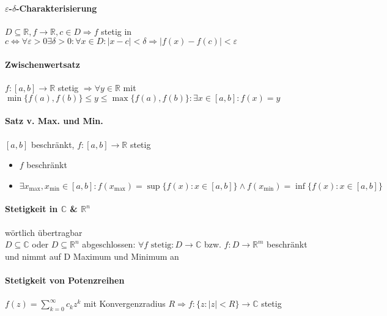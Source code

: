\documentclass[paper=a3,paper=landscape, fontsize=9pt,DIV=25]{scrartcl}
\newcommand{\real}{{\mathbb{R}}}
\newcommand{\compl}{\mathbb{C}}
\begin{document}
\begin{multicols*}{4}
  \paragraph{$\varepsilon$-$\delta$-Charakterisierung}
  $D \subseteq \real, f \rightarrow \real, c \in D \Rightarrow f$ stetig in $c \Leftrightarrow \forall \varepsilon > 0 \exists \delta > 0: \forall x \in D: \lvert x - c \rvert < \delta \Rightarrow \lvert f(x)-f(c)\rvert < \varepsilon$


  \paragraph{Zwischenwertsatz}
  $f:[a,b] \rightarrow \real$ stetig $\Rightarrow \forall y \in \real$ mit $ \min\{f(a),f(b)\} \leq y \leq \max\{f(a), f(b)\}: \exists x \in [a,b]: f(x)=y$


  \paragraph{Satz v. Max. und Min.}
  $[a,b]$ beschränkt, $f: [a,b] \rightarrow \real$ stetig
  \begin{itemize}
  \item $f$ beschränkt
  \item $\exists x_{\max}, x_{\min} \in [a,b]: f(x_{\max})=\sup\{f(x): x \in [a,b]\} \wedge f(x_{\min})=\inf\{f(x):x \in [a,b]\}$
  \end{itemize}

  \paragraph{Stetigkeit in $\compl$ \& $\real ^n$} wörtlich übertragbar\\
  $D \subseteq \compl$ oder $D \subseteq \real^n$ abgeschlossen: $\forall f \text{ stetig}: D \rightarrow \compl$ bzw. $f: D \rightarrow \real^m$ beschränkt und nimmt auf D Maximum und Minimum an

  \paragraph{Stetigkeit von Potenzreihen}
  $ f(z)=\sum_{k=0}^{\infty} c_kz^k$ mit Konvergenzradius $R \Rightarrow f: \{z: \lvert z \rvert < R \} \rightarrow \compl$ stetig



\end{multicols*}
\end{document}
